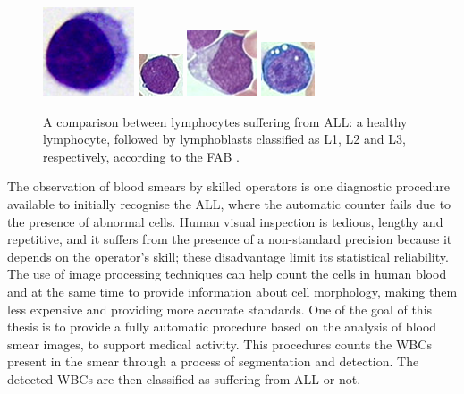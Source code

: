 \documentclass[final,a4paper,12pt,english]{UnicaPhdThesis3}
\begin{document}
\begin{figure}[!t]
\centering
\includegraphics[height=0.125\textheight]{images/crop-BlastNo}
\includegraphics[height=0.125\textheight]{images/crop-BlastL1}
\includegraphics[height=0.125\textheight]{images/crop-BlastL2}
\includegraphics[height=0.125\textheight]{images/crop-BlastL3}
\caption{\label{fig:ex2}A comparison between lymphocytes suffering from ALL: a healthy lymphocyte, followed by lymphoblasts classified as L1, L2 and L3, respectively, according to the FAB \cite{Bennett}.}
\end{figure}

The observation of blood smears by skilled operators is one diagnostic procedure available to initially recognise the ALL, where the automatic counter fails due to the presence of abnormal cells. Human visual inspection is tedious, lengthy and repetitive, and it suffers from the presence of a non-standard precision because it depends on the operator's skill; these disadvantage limit its statistical reliability. The use of image processing techniques can help count the cells in human blood and at the same time to provide information about cell morphology, making them less expensive and providing more accurate standards. One of the goal of this thesis is to provide a fully automatic procedure based on the analysis of blood smear images, to support medical activity. This procedures counts the WBCs present in the smear through a process of segmentation and detection. The detected WBCs are then classified as suffering from ALL or not. 
\end{document}
